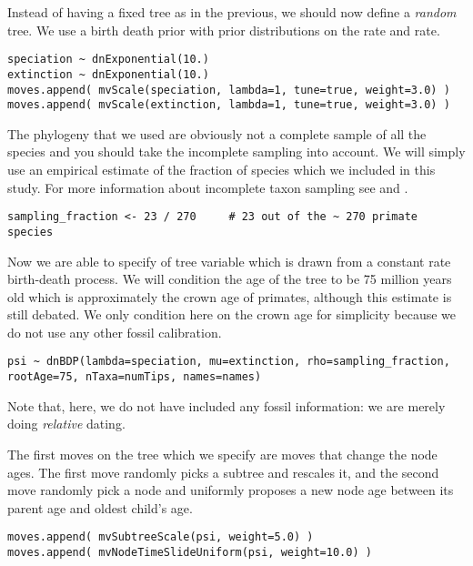 Instead of having a fixed tree as in the previous, we should now define a \emph{random} tree. We use a birth death prior with prior distributions on the  rate and  rate.
{\tt \small \begin{snugshade*}
\begin{lstlisting}
speciation ~ dnExponential(10.)
extinction ~ dnExponential(10.)
moves.append( mvScale(speciation, lambda=1, tune=true, weight=3.0) )
moves.append( mvScale(extinction, lambda=1, tune=true, weight=3.0) )
\end{lstlisting}
\end{snugshade*}}
The phylogeny that we used are obviously not a complete sample of all the species and you should take the incomplete sampling into account. We will simply use an empirical estimate of the fraction of species which we included in this study. For more information about incomplete taxon sampling see \cite{Hoehna2011} and \cite{Hoehna2014a}. 
{\tt \small \begin{snugshade*}
\begin{lstlisting}
sampling_fraction <- 23 / 270     # 23 out of the ~ 270 primate species
\end{lstlisting}
\end{snugshade*}}
Now we are able to specify of tree variable  which is drawn from a constant rate birth-death process. We will condition the age of the tree to be 75 million years old which is approximately the crown age of primates, although this estimate is still debated. We only condition here on the crown age for simplicity because we do not use any other fossil calibration.
{\tt \small \begin{snugshade*}
\begin{lstlisting}
psi ~ dnBDP(lambda=speciation, mu=extinction, rho=sampling_fraction, rootAge=75, nTaxa=numTips, names=names)
\end{lstlisting}
\end{snugshade*}}
Note that, here, we do not have included any fossil information: we are merely doing \emph{relative} dating. 

The first moves on the tree which we specify are moves that change the node ages. The first move randomly picks a subtree and rescales it, and the second move randomly pick a node and uniformly proposes a new node age between its parent age and oldest child's age.
{\tt \small \begin{snugshade*}
\begin{lstlisting}
moves.append( mvSubtreeScale(psi, weight=5.0) )
moves.append( mvNodeTimeSlideUniform(psi, weight=10.0) )
\end{lstlisting}
\end{snugshade*}}

